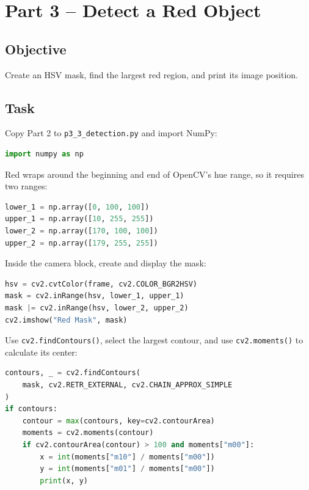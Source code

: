 \documentclass[11pt,a4paper]{article}
\begin{document}
\newpage

\section*{Part 3 -- Detect a Red Object}

\subsection*{Objective}

Create an HSV mask, find the largest red region, and print its image position.

\subsection*{Task}

Copy Part 2 to \texttt{p3\_3\_detection.py} and import NumPy:

\begin{lstlisting}[language=Python]
import numpy as np
\end{lstlisting}

Red wraps around the beginning and end of OpenCV's hue range, so it requires
two ranges:

\begin{lstlisting}[language=Python]
lower_1 = np.array([0, 100, 100])
upper_1 = np.array([10, 255, 255])
lower_2 = np.array([170, 100, 100])
upper_2 = np.array([179, 255, 255])
\end{lstlisting}

Inside the camera block, create and display the mask:

\begin{lstlisting}[language=Python]
hsv = cv2.cvtColor(frame, cv2.COLOR_BGR2HSV)
mask = cv2.inRange(hsv, lower_1, upper_1)
mask |= cv2.inRange(hsv, lower_2, upper_2)
cv2.imshow("Red Mask", mask)
\end{lstlisting}

Use \texttt{cv2.findContours()}, select the largest contour, and use
\texttt{cv2.moments()} to calculate its center:

\begin{lstlisting}[language=Python]
contours, _ = cv2.findContours(
    mask, cv2.RETR_EXTERNAL, cv2.CHAIN_APPROX_SIMPLE
)
if contours:
    contour = max(contours, key=cv2.contourArea)
    moments = cv2.moments(contour)
    if cv2.contourArea(contour) > 100 and moments["m00"]:
        x = int(moments["m10"] / moments["m00"])
        y = int(moments["m01"] / moments["m00"])
        print(x, y)
\end{lstlisting}
\end{document}
